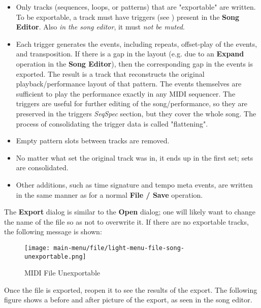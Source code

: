    \begin{itemize}
      \item Only tracks (sequences, loops, or patterns)
         that are "exportable" are written.  To be exportable, a
         track must have triggers
         (see )
         present in the \textbf{Song Editor}.
         Also \textsl{in the song editor}, it must \textsl{not be muted}.
      \item Each trigger generates the events, including repeats,
         offset-play of the events, and transposition.
         If there is a gap in the layout
         (e.g. due to an \textbf{Expand} operation in the
         \textbf{Song Editor}),
         then the corresponding gap in the events is exported.
         The result is a track that reconstructs the original
         playback/performance layout of that pattern.
         The events themselves are sufficient to play the performance exactly
         in any MIDI sequencer.
         The triggers are useful for further editing of the song/performance,
         so they are preserved in the triggers \textsl{SeqSpec} section, but
         they cover the whole song.
         The process of consolidating the trigger data is called
         "flattening".
      \item Empty pattern slots between tracks are removed.
      \item No matter what set the original track was in, it ends up in the
         first set; sets are consolidated.
      \item Other additions, such as time signature and tempo meta events, are
         written in the same manner as for a normal \textbf{File / Save}
         operation.
   \end{itemize}

   The \textbf{Export} dialog is similar to the \textbf{Open} dialog;
   one will likely want to change the name of the file so as
   not to overwrite it.
   If there are no exportable tracks, the following message is shown:

\begin{figure}[H]
   \centering 
   \texttt{[image: main-menu/file/light-menu-file-song-unexportable.png]}
   \caption{MIDI File Unexportable}
   \label{fig:midi_export_file_unexportable}
\end{figure}

   Once the file is exported, reopen it to see the results of the export.
   The following figure shows a before and after picture of the export, as
   seen in the song editor.


